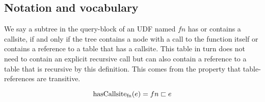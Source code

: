 

\subsection{Notation and vocabulary}


We say a subtree in the query-block of an UDF named $fn$ has or contains a callsite, if and only if the tree contains a node with a call to the function itself or contains a reference to a table that has a callsite. This table in turn does not need to contain an explicit recursive call but can also contain a reference to a table that is recursive by this definition. This comes from the property that table-references are transitive.

$$\operatorname{\text{hasCallsite}_{fn}}(e) = fn \sqsubset e$$


